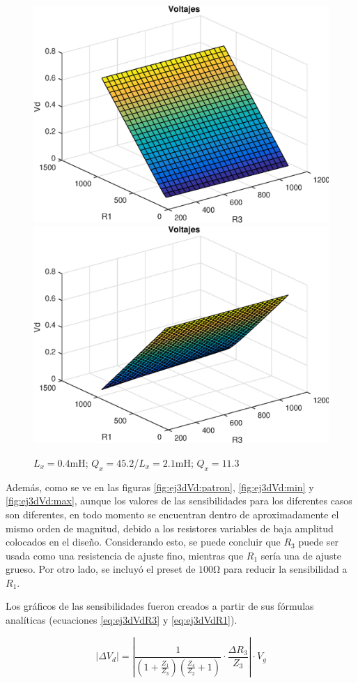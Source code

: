     \begin{figure}[ht]
        \begin{center}
            \includegraphics[width=0.45\linewidth]{MATLAB/ej3Vdmin}
            \includegraphics[width=0.45\linewidth]{MATLAB/ej3Vdmax}
            \caption{$L_x=0.4\si{\milli\henry}$; $Q_x=45.2$/$L_x=2.1\si{\milli\henry}$; $Q_x=11.3$}
            \label{fig:ej3Vd:min-MAX}
        \end{center}
    \end{figure}

    Además, como se ve en las figuras \ref{fig:ej3dVd:patron}, \ref{fig:ej3dVd:min} y \ref{fig:ej3dVd:max}, 
    aunque los valores de las sensibilidades para los diferentes casos son diferentes, en todo
    momento se encuentran dentro de aproximadamente el mismo orden de magnitud, debido a los resistores
    variables de baja amplitud colocados en el diseño. Considerando esto, se puede concluir que $R_3$
    puede ser usada como una resistencia de ajuste fino, mientras que $R_1$ sería una de ajuste grueso.
    Por otro lado, se incluyó el preset de $100\si{\ohm}$ para reducir la sensibilidad a $R_1$.

    Los gráficos de las sensibilidades fueron creados a partir de sus fórmulas analíticas (ecuaciones \ref{eq:ej3dVdR3} y \ref{eq:ej3dVdR1}).

    \begin{equation}
        |\Delta V_d| = \left| \frac{1}{(1+\frac{Z_1}{Z_3})(\frac{Z_4}{Z_2} + 1)} \cdot \frac{\Delta R_3}{Z_3} \right| \cdot V_g 
        \label{eq:ej3dVdR3}
    \end{equation}

